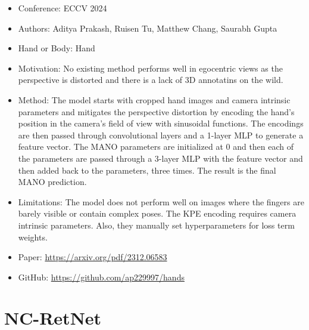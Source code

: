 \documentclass{article}
\begin{document}
\begin{itemize}
    \item Conference: ECCV 2024
    \item Authors: Aditya Prakash, Ruisen Tu, Matthew Chang, Saurabh Gupta
    \item Hand or Body: Hand
    \item Motivation: No existing method performs well in egocentric views as the perspective is distorted and there is a lack of 3D annotatins on the wild.
    \item Method: The model starts with cropped hand images and camera intrinsic parameters and mitigates the perspective distortion by encoding the hand's position in the camera's field of view with sinusoidal functions. The encodings are then passed through convolutional layers and a 1-layer MLP to generate a feature vector. The MANO parameters are initialized at 0 and then each of the parameters are passed through a 3-layer MLP with the feature vector and then added back to the parameters, three times. The result is the final MANO prediction.
    \item Limitations: The model does not perform well on images where the fingers are barely visible or contain complex poses. The KPE encoding requires camera intrinsic parameters. Also, they manually set hyperparameters for loss term weights.
    \item Paper: \url{https://arxiv.org/pdf/2312.06583}
    \item GitHub: \url{https://github.com/ap229997/hands}
\end{itemize}

\section*{NC-RetNet}
\end{document}

